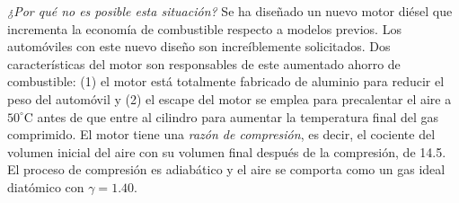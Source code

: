 \item \textit{¿Por qué no es posible esta situación?} Se ha diseñado un nuevo motor diésel que incrementa la economía de combustible respecto a modelos previos. Los automóviles con este nuevo diseño son increíblemente solicitados. Dos características del motor son responsables de este aumentado ahorro de combustible: (1) el motor está totalmente fabricado de aluminio para reducir el peso del automóvil y (2) el escape del motor se emplea para precalentar el aire a $50^\circ\text{C}$ antes de que entre al cilindro para aumentar la temperatura final del gas comprimido. El motor tiene una \textit{razón de compresión}, es decir, el cociente del volumen inicial del aire con su volumen final después de la compresión, de 14.5. El proceso de compresión es adiabático y el aire se comporta como un gas ideal diatómico con $\gamma = 1.40$.
